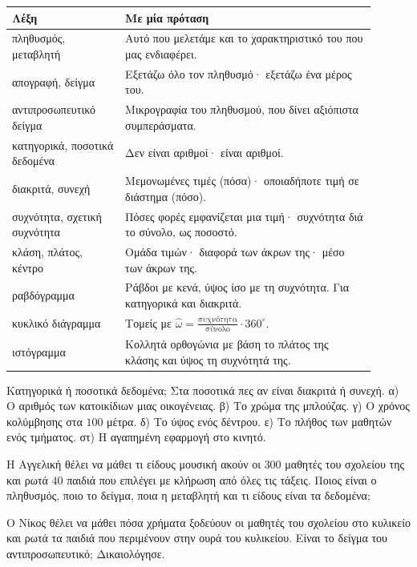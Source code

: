 

\renewcommand{\arraystretch}{1.5}
\begin{longtable}{@{}>{\raggedright\arraybackslash}p{0.28\linewidth} >{\raggedright\arraybackslash}p{0.62\linewidth}@{}}
\toprule
\textbf{Λέξη} & \textbf{Με μία πρόταση}\\
\midrule
\endhead
πληθυσμός, μεταβλητή & Αυτό που μελετάμε και το χαρακτηριστικό του που μας ενδιαφέρει.\\
απογραφή, δείγμα & Εξετάζω όλο τον πληθυσμό· εξετάζω ένα μέρος του.\\
αντιπροσωπευτικό δείγμα & Μικρογραφία του πληθυσμού, που δίνει αξιόπιστα συμπεράσματα.\\
κατηγορικά, ποσοτικά δεδομένα & Δεν είναι αριθμοί· είναι αριθμοί.\\
διακριτά, συνεχή & Μεμονωμένες τιμές (πόσα)· οποιαδήποτε τιμή σε διάστημα (πόσο).\\
συχνότητα, σχετική συχνότητα & Πόσες φορές εμφανίζεται μια τιμή· συχνότητα διά το σύνολο, ως ποσοστό.\\
κλάση, πλάτος, κέντρο & Ομάδα τιμών· διαφορά των άκρων της· μέσο των άκρων της.\\
ραβδόγραμμα & Ράβδοι με κενά, ύψος ίσο με τη συχνότητα. Για κατηγορικά και διακριτά.\\
κυκλικό διάγραμμα & Τομείς με $\hat{\omega}=\frac{\text{συχνότητα}}{\text{σύνολο}}\cdot360^\circ$.\\
ιστόγραμμα & Κολλητά ορθογώνια με βάση το πλάτος της κλάσης και ύψος τη συχνότητά της.\\
\bottomrule
\end{longtable}


\ex Κατηγορικά ή ποσοτικά δεδομένα; Στα ποσοτικά πες αν είναι διακριτά ή συνεχή. α) Ο αριθμός των κατοικίδιων μιας οικογένειας. β) Το χρώμα της μπλούζας. γ) Ο χρόνος κολύμβησης στα $100$ μέτρα. δ) Το ύψος ενός δέντρου. ε) Το πλήθος των μαθητών ενός τμήματος. στ) Η αγαπημένη εφαρμογή στο κινητό.

\ex Η Αγγελική θέλει να μάθει τι είδους μουσική ακούν οι $300$ μαθητές του σχολείου της και ρωτά $40$ παιδιά που επιλέγει με κλήρωση από όλες τις τάξεις. Ποιος είναι ο πληθυσμός, ποιο το δείγμα, ποια η μεταβλητή και τι είδους είναι τα δεδομένα;

\ex Ο Νίκος θέλει να μάθει πόσα χρήματα ξοδεύουν οι μαθητές του σχολείου στο κυλικείο και ρωτά τα παιδιά που περιμένουν στην ουρά του κυλικείου. Είναι το δείγμα του αντιπροσωπευτικό; Δικαιολόγησε.

